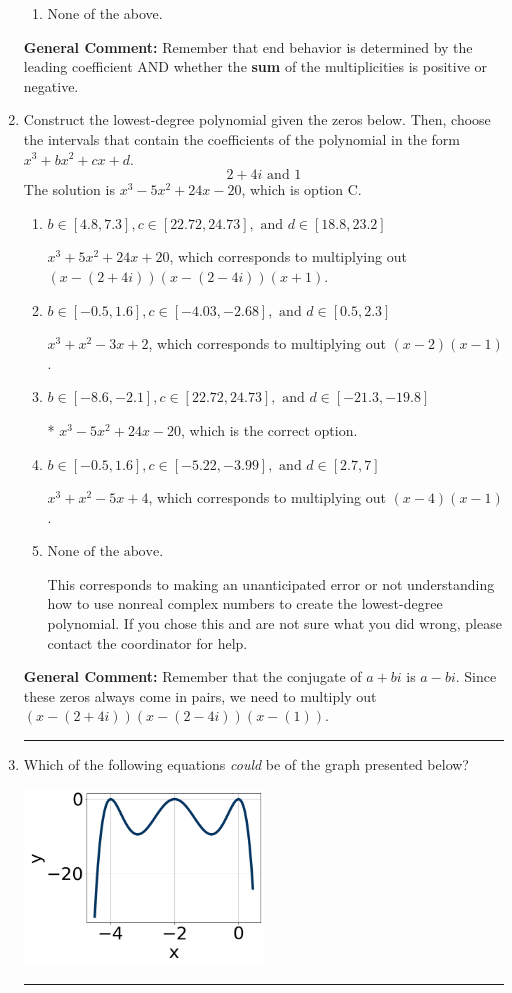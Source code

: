 \documentclass{extbook}[14pt]
\newcommand{\litem}[1]{\item #1

\rule{\textwidth}{0.4pt}}
\begin{document}
\begin{enumerate}
{\begin{enumerate}[label=\Alph*.]
\begin{multicols}{2}
\end{multicols}\item None of the above.\end{enumerate}
\textbf{General Comment:} Remember that end behavior is determined by the leading coefficient AND whether the \textbf{sum} of the multiplicities is positive or negative.
}
\litem{
Construct the lowest-degree polynomial given the zeros below. Then, choose the intervals that contain the coefficients of the polynomial in the form $x^3+bx^2+cx+d$.
\[ 2 + 4 i \text{ and } 1 \]The solution is \( x^{3} -5 x^{2} +24 x -20 \), which is option C.\begin{enumerate}[label=\Alph*.]
\item \( b \in [4.8, 7.3], c \in [22.72, 24.73], \text{ and } d \in [18.8, 23.2] \)

$x^{3} +5 x^{2} +24 x + 20$, which corresponds to multiplying out $(x-(2 + 4 i))(x-(2 - 4 i))(x + 1)$.
\item \( b \in [-0.5, 1.6], c \in [-4.03, -2.68], \text{ and } d \in [0.5, 2.3] \)

$x^{3} + x^{2} -3 x + 2$, which corresponds to multiplying out $(x -2)(x -1)$.
\item \( b \in [-8.6, -2.1], c \in [22.72, 24.73], \text{ and } d \in [-21.3, -19.8] \)

* $x^{3} -5 x^{2} +24 x -20$, which is the correct option.
\item \( b \in [-0.5, 1.6], c \in [-5.22, -3.99], \text{ and } d \in [2.7, 7] \)

$x^{3} + x^{2} -5 x + 4$, which corresponds to multiplying out $(x -4)(x -1)$.
\item \( \text{None of the above.} \)

This corresponds to making an unanticipated error or not understanding how to use nonreal complex numbers to create the lowest-degree polynomial. If you chose this and are not sure what you did wrong, please contact the coordinator for help.
\end{enumerate}

\textbf{General Comment:} Remember that the conjugate of $a+bi$ is $a-bi$. Since these zeros always come in pairs, we need to multiply out $(x-(2 + 4 i))(x-(2 - 4 i))(x-(1))$.
}
\litem{
Which of the following equations \textit{could} be of the graph presented below?

\begin{center}
    \includegraphics[width=0.5\textwidth]{../Figures/polyGraphToFunctionCopyC.png}
\end{center}


}
\end{enumerate}
\end{document}
